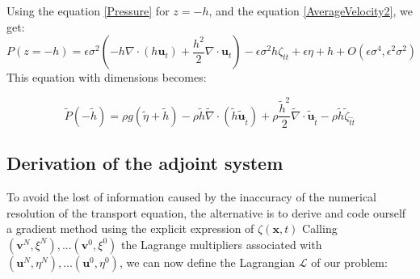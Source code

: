 \documentclass[11pt,a4paper]{article}
\begin{document}
				Using the equation \eqref{Pressure} for $ z = -h$, and the equation \eqref{AverageVelocity2}, we get:
			\begin{equation}
				P(z=-h) = \epsilon \sigma^2(-h\nabla \cdot (h \mathbf{u}_t) + \frac{h^2}{2} \nabla \cdot \mathbf{u}_t) - \epsilon \sigma^2 h \zeta_{tt} + \epsilon \eta + h + O(\epsilon\sigma^4, \epsilon^2 \sigma^2)
			\end{equation}			
			This equation with dimensions becomes:
			
			\begin{equation}
				\tilde{P}(-\tilde{h}) = \rho g (\tilde{\eta} + \tilde{h} ) - \rho \tilde h \tilde {\nabla} \cdot (\tilde h \tilde{\mathbf{u}}_{\tilde t}) + \rho \frac{\tilde h^2}{2} \tilde \nabla \cdot \tilde{\mathbf{u}}_{\tilde t} - \rho \tilde h \tilde \zeta_{\tilde t \tilde t}
			\end{equation}
					

\subsection{Derivation of the adjoint system}
	To avoid the lost of information caused by the inaccuracy of the numerical resolution of the transport equation, the alternative is to derive and code ourself a gradient method using the explicit expression of $\zeta(\mathbf{x},t)$
	Calling $(\mathbf{v}^N, \xi^N), ... (\mathbf{v}^0, \xi^0)$ the Lagrange multipliers associated with $(\mathbf{u}^N, \eta^N), ... (\mathbf{u}^0, \eta^0)$, we can now define the Lagrangian $\mathcal{L} $ of our problem: 
		
\end{document}
